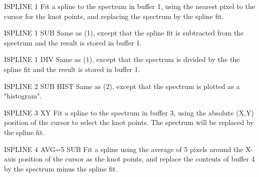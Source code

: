 {\newpage\clearpage
{}%
\begin{example} 
  \item[ISPLINE 1 \hfill]{Fit a spline to the spectrum in buffer 1, using
       the nearest pixel to the cursor for the knot points, and replacing
       the spectrum by the spline fit.}
\par\item[ISPLINE 1 SUB\hfill]{Same as (1), except that the spline fit is
       subtracted from the spectrum and the result is stored in buffer 1.}
\par\item[ISPLINE 1 DIV \hfill]{Same as (1), except that the spectrum is
       divided by the the spline fit and the result is stored in buffer 1.}
\par\item[ISPLINE 2 SUB HIST\hfill]{Same as (2), except that the spectrum is
       plotted as a "histogram".}
\par\item[ISPLINE 3 XY\hfill]{Fit a spline to the spectrum in buffer 3, using
       the absolute (X,Y) position of the cursor to select the knot points.
       The spectrum will be replaced by the spline fit.}
\par\item[ISPLINE 4 AVG=5 SUB\hfill]{Fit a spline using the average of 5
       pixels around the X-axis position of the cursor as the knot points,
       and replace the contents of buffer 4 by the spectrum minus the
       spline fit.}
\end{example}%
\lthtmlfigureZ
\lthtmlcheckvsize\clearpage}

